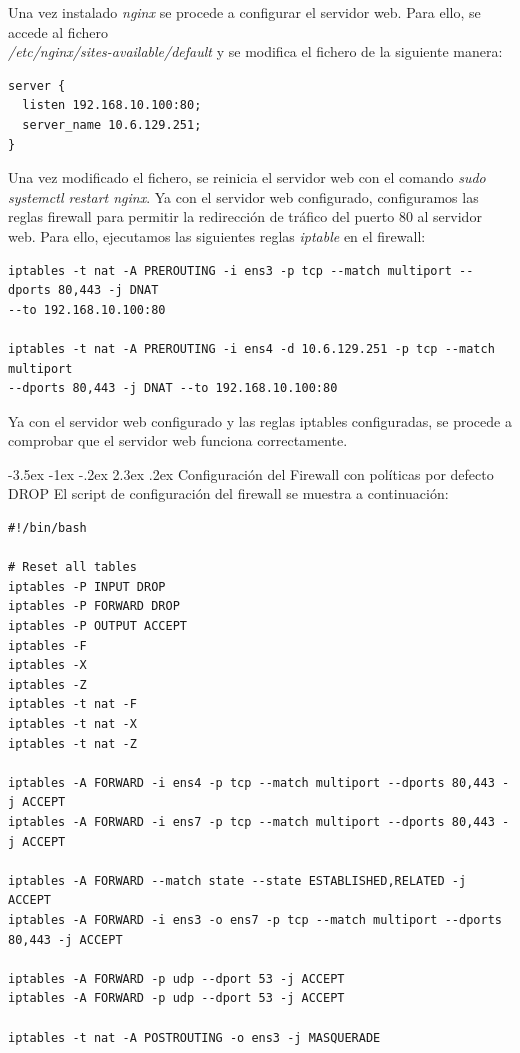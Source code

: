\documentclass[11pt]{report} %
\makeatletter
\renewcommand\chapter{\@startsection{chapter}{0}{\z@}%
    {-3.5ex \@plus -1ex \@minus -.2ex}%
    {2.3ex \@plus.2ex}%
    {\normalfont\Large\bfseries}}
\makeatother
\begin{document}
Una vez instalado \emph{nginx} se procede a configurar el servidor web. Para ello, se accede al fichero \\
\emph{/etc/nginx/sites-available/default} y se modifica el fichero de la siguiente manera:

\begin{verbatim}
server {
  listen 192.168.10.100:80;
  server_name 10.6.129.251;
}
\end{verbatim}

Una vez modificado el fichero, se reinicia el servidor web con el comando \emph{sudo systemctl restart nginx}. Ya 
con el servidor web configurado, configuramos las reglas firewall para permitir la redirección de tráfico del puerto
80 al servidor web. Para ello, ejecutamos las siguientes reglas \emph{iptable} en el firewall:

\begin{verbatim}
iptables -t nat -A PREROUTING -i ens3 -p tcp --match multiport --dports 80,443 -j DNAT 
--to 192.168.10.100:80

iptables -t nat -A PREROUTING -i ens4 -d 10.6.129.251 -p tcp --match multiport 
--dports 80,443 -j DNAT --to 192.168.10.100:80
\end{verbatim}

Ya con el servidor web configurado y las reglas iptables configuradas, se procede a comprobar que el servidor web
funciona correctamente.


\cleardoublepage

\chapter{Configuración del Firewall con políticas por defecto DROP}
El script de configuración del firewall se muestra a continuación:

\begin{verbatim}
#!/bin/bash

# Reset all tables
iptables -P INPUT DROP
iptables -P FORWARD DROP
iptables -P OUTPUT ACCEPT
iptables -F
iptables -X
iptables -Z
iptables -t nat -F
iptables -t nat -X
iptables -t nat -Z

iptables -A FORWARD -i ens4 -p tcp --match multiport --dports 80,443 -j ACCEPT
iptables -A FORWARD -i ens7 -p tcp --match multiport --dports 80,443 -j ACCEPT

iptables -A FORWARD --match state --state ESTABLISHED,RELATED -j ACCEPT
iptables -A FORWARD -i ens3 -o ens7 -p tcp --match multiport --dports 80,443 -j ACCEPT

iptables -A FORWARD -p udp --dport 53 -j ACCEPT
iptables -A FORWARD -p udp --dport 53 -j ACCEPT

iptables -t nat -A POSTROUTING -o ens3 -j MASQUERADE
\end{verbatim}
\end{document}
